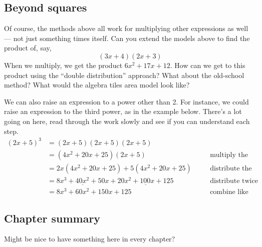 \subsection{Beyond squares}

Of course, the methods above all work for multiplying other expressions as well --- not just something times itself. Can you extend the models above to find the product of, say, \[(3x + 4)(2x + 3)\] When we multiply, we get the product $6x^2 + 17x + 12$. How can we get to this product using the ``double distribution'' approach? What about the old-school method? What would the algebra tiles area model look like?

We can also raise an expression to a power other than 2. For instance, we could raise an expression to the third power, as in the example below. There's a lot going on here, read through the work slowly and see if you can understand each step.
\[\begin{aligned}
(2x+5)^3 &= (2x+5)(2x+5)(2x+5)
\\
&= (4x^2+20x+25)(2x+5)
&&\quad\text{multiply the first two terms}
\\
&= 2x(4x^2+20x+25) + 5(4x^2+20x+25)
&&\quad\text{distribute the three-term expression!}
\\
&= \underline{8x^3 + 40x^2 + 50x} + \underline{20x^2 + 100x + 125}
&&\quad\text{distribute twice more}
\\
&= 8x^3 + 60x^2 + 150x + 125
&&\quad\text{combine like terms}
\end{aligned}\]

\subsection*{Chapter summary}

Might be nice to have something here in every chapter?
